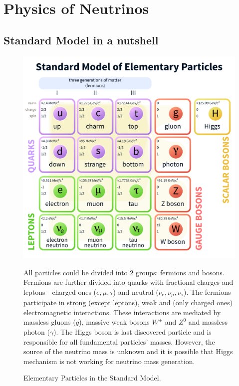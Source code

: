 \chapter{Physics of Neutrinos}
\label{neutrino_physics_chapter}

\section{Standard Model in a nutshell}
\begin{figure}
\includegraphics[width=1.0\textwidth]{figures/Standard_Model_of_Elementary_Particles.png}\\%
\caption{Elementary Particles in the Standard Model.} 
{All particles could be divided into 2 groups: fermions and bosons. Fermions are 
further divided into quarks with fractional charges and leptons - charged ones ($e, \mu, \tau$)
and neutral ($\nu_e, \nu_\mu, \nu_{\tau}$). The fermions participate in strong (except leptons), 
weak and (only charged ones) electromagnetic interactions. These interactions are 
mediated by massless gluons ($g$), massive weak bosons $W^{\pm}$ and $Z^0$ and massless
photon ($\gamma$). The Higgs boson is last discovered particle and is responsible for all fundamental 
particles' masses. However, the source of the neutrino mass is unknown and it is possible that 
Higgs mechanism is not working for neutrino mass generation.}
\end{figure}

